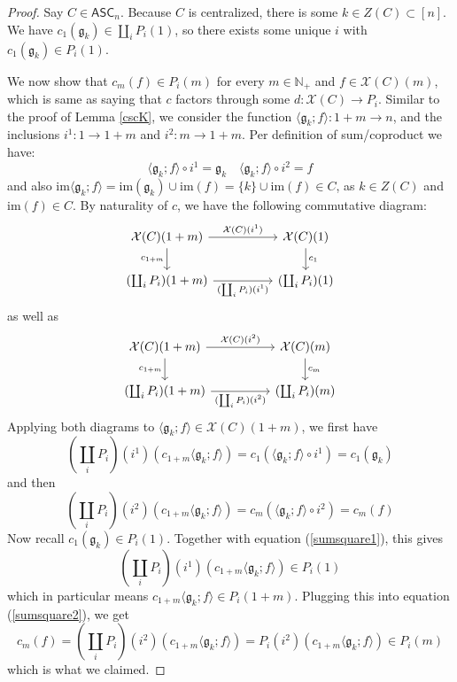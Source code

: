 \documentclass{article}
\theoremstyle{remark}
\theoremstyle{definition}
\newcommand{\N}{\mathbb N}
\newcommand{\ASC}{\mathsf{ASC}}
\newcommand{\im}{\mathrm{im}}
\newcommand{\X}{\mathcal X}
\newcommand{\g}{\mathfrak g}
\begin{document}
	\begin{proof}
		Say $C\in\ASC_n$. Because $C$ is centralized, there is some $k\in Z(C)\subset[n]$. We have $c_1(\g_k)\in\coprod_iP_i(1)$, so there exists some unique $i$ with $c_1(\g_k)\in P_i(1)$.
		
		We now show that $c_m(f)\in P_i(m)$ for every $m\in\N_+$ and $f\in\X(C)(m)$, which is same as saying that $c$ factors through some $d:\X(C)\to P_i$. Similar to the proof of Lemma \ref{cscK}, we consider the function $\langle\g_k;f\rangle:1+m\to n$, and the inclusions $i^1:1\to1+m$ and $i^2:m\to1+m$. Per definition of sum/coproduct we have:
		\[\langle\g_k;f\rangle\circ i^1=\g_k\quad\langle\g_k;f\rangle\circ i^2=f\]
		and also $\im\langle\g_k;f\rangle=\im(\g_k)\cup\im(f)=\{k\}\cup\im(f)\in C$, as $k\in Z(C)$ and $\im(f)\in C$. By naturality of $c$, we have the following commutative diagram:
		\[\begin{tikzcd}
			\X(C)(1+m)\arrow{rr}{\X(C)(i^1)}\arrow{d}[swap]{c_{1+m}}&&
			\X(C)(1)\arrow{d}{c_1}\\
			(\coprod_iP_i)(1+m)\arrow{rr}[swap]{(\coprod_iP_i)(i^1)}&&
			(\coprod_iP_i)(1)
		\end{tikzcd}\]
		as well as
		\[\begin{tikzcd}
			\X(C)(1+m)\arrow{rr}{\X(C)(i^2)}\arrow{d}[swap]{c_{1+m}}&&
			\X(C)(m)\arrow{d}{c_m}\\
			(\coprod_iP_i)(1+m)\arrow{rr}[swap]{(\coprod_iP_i)(i^2)}&&
			(\coprod_iP_i)(m)
		\end{tikzcd}\]
		Applying both diagrams to $\langle\g_k;f\rangle\in\X(C)(1+m)$, we first have
		\begin{equation}\label{sumsquare1}
			\left(\coprod_iP_i\right)(i^1)(c_{1+m}\langle\g_k;f\rangle)=c_1(\langle\g_k;f\rangle\circ i^1)=c_1(\g_k)
		\end{equation}
		and then
		\begin{equation}\label{sumsquare2}
			\left(\coprod_iP_i\right)(i^2)(c_{1+m}\langle\g_k;f\rangle)=c_m(\langle\g_k;f\rangle\circ i^2)=c_m(f)
		\end{equation}
		Now recall $c_1(\g_k)\in P_i(1)$. Together with equation (\ref{sumsquare1}), this gives
		\[\left(\coprod_iP_i\right)(i^1)(c_{1+m}\langle\g_k;f\rangle)\in P_i(1)\]
		which in particular means $c_{1+m}\langle\g_k;f\rangle\in P_i(1+m)$. Plugging this into equation (\ref{sumsquare2}), we get
		\[c_m(f)=\left(\coprod_iP_i\right)(i^2)(c_{1+m}\langle\g_k;f\rangle)=P_i(i^2)(c_{1+m}\langle\g_k;f\rangle)\in P_i(m)\]
		which is what we claimed.
	\end{proof}
\end{document}
